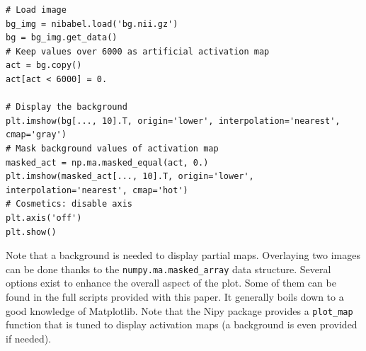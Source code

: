 \documentclass{frontiersSCNS} %
\newcommand{\alex}[1]{\todo[inline, color=green!40]{#1}}
\begin{document}
\begin{lstlisting}
# Load image
bg_img = nibabel.load('bg.nii.gz')
bg = bg_img.get_data()
# Keep values over 6000 as artificial activation map
act = bg.copy()
act[act < 6000] = 0.

# Display the background
plt.imshow(bg[..., 10].T, origin='lower', interpolation='nearest', cmap='gray')
# Mask background values of activation map
masked_act = np.ma.masked_equal(act, 0.)
plt.imshow(masked_act[..., 10].T, origin='lower', interpolation='nearest', cmap='hot')
# Cosmetics: disable axis
plt.axis('off')
plt.show()
\end{lstlisting}

Note that a background is needed to display partial maps. Overlaying two images
can be done thanks to the \texttt{numpy.ma.masked\_array} data structure.
Several options exist to enhance the overall aspect of the plot.
Some of them can be found in the full scripts provided with this paper.
It generally
boils down to a good knowledge of Matplotlib. Note that the Nipy package provides a
\texttt{plot\_map} function that is tuned to display activation maps (a
background is even provided if needed).






%
\end{document}
